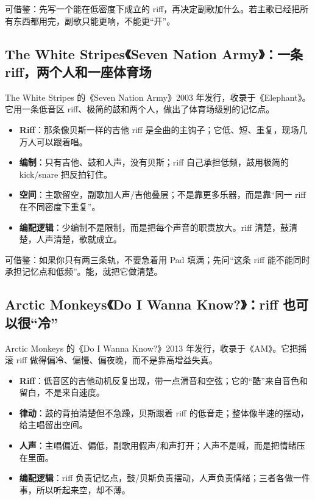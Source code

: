 可借鉴：先写一个能在低密度下成立的 riff，再决定副歌加什么。若主歌已经把所有东西都用完，副歌只能更响，不能更“开”。

\subsection{The White Stripes《Seven Nation Army》：一条 riff，两个人和一座体育场}
\label{sec:rock-case-seven-nation}

The White Stripes 的《Seven Nation Army》2003 年发行，收录于《Elephant》。它用一条低音区 riff、极简的鼓和两个人，做出了体育场级别的记忆点。

\begin{itemize}
\item \textbf{Riff}：那条像贝斯一样的吉他 riff 是全曲的主钩子；它低、短、重复，现场几万人可以跟着唱。
\item \textbf{编制}：只有吉他、鼓和人声，没有贝斯；riff 自己承担低频，鼓用极简的 kick/snare 把反拍钉住。
\item \textbf{空间}：主歌留空，副歌加人声/吉他叠层；不是靠更多乐器，而是靠“同一 riff 在不同密度下重复”。
\item \textbf{编配逻辑}：少编制不是限制，而是把每个声音的职责放大。riff 清楚，鼓清楚，人声清楚，歌就成立。
\end{itemize}

可借鉴：如果你只有两三条轨，不要急着用 Pad 填满；先问“这条 riff 能不能同时承担记忆点和低频”。能，就把它做清楚。

\subsection{Arctic Monkeys《Do I Wanna Know?》：riff 也可以很“冷”}
\label{sec:rock-case-do-i-wanna-know}

Arctic Monkeys 的《Do I Wanna Know?》2013 年发行，收录于《AM》。它把摇滚 riff 做得偏冷、偏慢、偏夜晚，而不是靠高增益失真。

\begin{itemize}
\item \textbf{Riff}：低音区的吉他动机反复出现，带一点滑音和空弦；它的“酷”来自音色和留白，不是来自速度。
\item \textbf{律动}：鼓的背拍清楚但不急躁，贝斯跟着 riff 的低音走；整体像半速的摆动，给主唱留出空间。
\item \textbf{人声}：主唱偏近、偏低，副歌用假声/和声打开；人声不是喊，而是把情绪压在里面。
\item \textbf{编配逻辑}：riff 负责记忆点，鼓/贝斯负责摆动，人声负责情绪；三者各做一件事，所以听起来空，却不薄。
\end{itemize}

